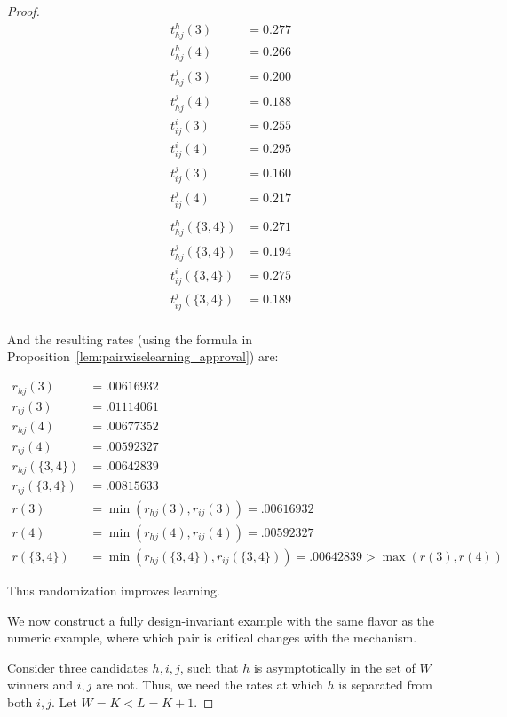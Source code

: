 \documentclass[10pt]{article}
\begin{document}
\begin{ReviewVerbatim}
\begin{proof}
%
%
%
%
%
%
%
%
%
%
%

\begin{align*}
t_{hj}^h(3)&= 0.277 \\
t_{hj}^h(4)&= 0.266	\\
t_{hj}^j(3)&= 0.200	\\
t_{hj}^j(4)&= 0.188	\\
t_{ij}^i(3)&= 0.255	\\
t_{ij}^i(4)&= 0.295	\\
t_{ij}^j(3)&= 0.160\\
t_{ij}^j(4)&= 0.217\\\\
%
t_{hj}^h(\{3, 4\})&= 0.271	 \\
t_{hj}^j(\{3, 4\})&= 0.194	\\
t_{ij}^i(\{3, 4\})&= 0.275	\\
t_{ij}^j(\{3, 4\})&= 0.189\\
\end{align*}

And the resulting rates (using the formula in Proposition~\ref{lem:pairwiselearning_approval}) are:

\begin{align*}
r_{hj}(3) &= .00616932\\
r_{ij}(3) &= .01114061\\
r_{hj}(4) &= .00677352\\
r_{ij}(4) &= .00592327\\
r_{hj}(\{3, 4\}) &= .00642839\\
r_{ij}(\{3, 4\}) &= .00815633\\
r(3) &= \min(r_{hj}(3), r_{ij}(3)) = .00616932\\
r(4) &= \min(r_{hj}(4), r_{ij}(4)) = .00592327\\
r(\{3, 4\}) &= \min(r_{hj}(\{3, 4\}), r_{ij}(\{3, 4\})) = .00642839 > \max(r(3), r(4))
\end{align*}

Thus randomization improves learning.

%
%
%
%
%
%
%
%
%
%
%

	We now construct a fully design-invariant example with the same flavor as the numeric example, where which pair is critical changes with the mechanism.

	Consider three candidates $h,i,j$, such that $h$ is asymptotically in the set of $W$ winners and $i,j$ are not. Thus, we need the rates at which $h$ is separated from both $i,j$. Let $W=K < L=K+1$.


\end{proof}
\end{ReviewVerbatim}
\end{document}
